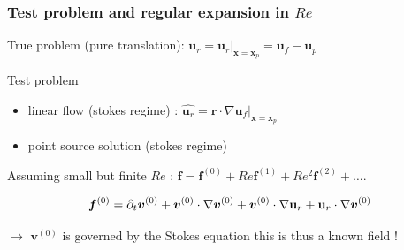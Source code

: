 \documentclass{sintefbeamer}
\begin{document}
\begin{frame}
  \frametitle{Test problem and regular expansion in $Re$}

  True problem (pure translation): $\textbf{u}_r  = \textbf{u}_r|_{\bm x = \bm x_p} = \textbf{u}_f-\textbf{u}_p$
  \vspace{0.5cm}

  Test problem 
  \begin{itemize}
    \item linear flow (stokes regime) : $\hat{\textbf{u}_r} =  \textbf{r} \cdot \nabla \hat{\textbf{u}}_f |_{\bm x = \bm x_p}$
    \item point source solution (stokes regime)
  \end{itemize}
  \vspace{0.5cm}

  Assuming small but finite $Re$ : $\bm f = \bm f^{(0)} + Re  \bm f^{(1)} + Re^2  \bm f^{(2)} + \ldots$. 

  
  \begin{equation*}
    \bm f^{(0)}
    =
        \partial_t \bm v^{(0)}
        + \bm v^{(0)}\cdot \mathbf{\nabla}\bm v^{(0)} 
        +  \bm v^{(0)}\cdot \mathbf{\nabla}\textbf{u}_r 
        +  \textbf{u}_r\cdot \mathbf{\nabla}\bm v^{(0)}
  \end{equation*}

  $\to$ $\bm v^{(0)}$ is governed by the Stokes equation this is thus a known field ! 
\end{frame}

\end{document}
